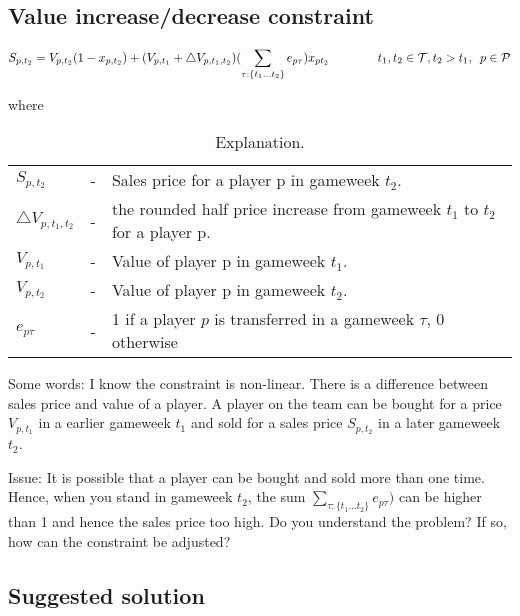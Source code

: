 \newpage

\subsection{Value increase/decrease constraint}

\begin{equation*}
    S_{p,t_{2}} = V_{p,t_{2}}(1-x_{p,t_{2}}) + (V_{p,t_{1}} + \triangle V_{p,t_{1},t_{2}}) (\sum_{\tau:\{ t_{1} \dots t_{2}\}} e_{p\tau}) x_{pt_{2}} \qquad\qquad t_{1}, t_{2} \in \mathcal{T}, t_{2} > t_{1}, \enskip p \in \mathcal{P}
\end{equation*}

where 


\begin{table}[H]
\centering
\caption{Explanation.}
\begin{tabular}{@{}lll@{}}
\toprule
$S_{p,t_{2}}$ & - & Sales price for a player p in gameweek $t_{2}$.\\
$\triangle V_{p,t_{1},t_{2}}$  & - & the rounded half price increase from gameweek $t_{1}$ to $t_{2}$ for a player p. \\ 
$V_{p,t_{1}}$   & - & Value of player p in gameweek $t_{1}$.                                             \\
$V_{p,t_{2}}$   & - & Value of player p in gameweek $t_{2}$.                                             \\
$e_{p\tau}$     & - & 1 if a player $p$ is transferred in a gameweek $\tau$, 0 otherwise                  \\
\bottomrule
\end{tabular}
\end{table}

Some words: I know the constraint is non-linear. There is a difference between sales price and value of a player. A player on the team can be bought for a price $V_{p,t_{1}}$ in a earlier gameweek $t_{1}$ and sold for a sales price $S_{p,t_{2}}$ in a later gameweek $t_{2}$.

\newpar

Issue: It is possible that a player can be bought and sold more than one time. Hence, when you stand in gameweek $t_{2}$, the sum $\sum_{\tau:\{ t_{1} \dots t_{2}\}} e_{p\tau})$ can be higher than 1 and hence the sales price too high. Do you understand the problem? If so, how can the constraint be adjusted? 


\subsection{Suggested solution}

